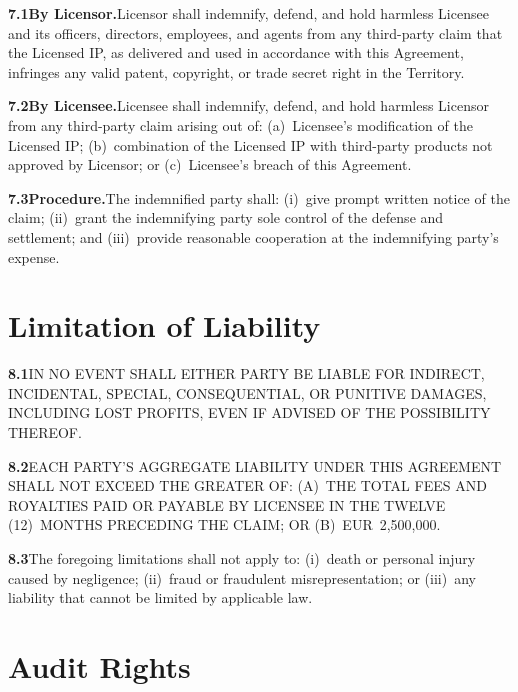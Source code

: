 \documentclass[11pt,a4paper]{article}
\begin{document}
\textbf{7.1\enspace By Licensor.}\enspace Licensor shall indemnify, defend, and hold harmless
Licensee and its officers, directors, employees, and agents from any third-party claim that the
Licensed IP, as delivered and used in accordance with this Agreement, infringes any valid
patent, copyright, or trade secret right in the Territory.

\textbf{7.2\enspace By Licensee.}\enspace Licensee shall indemnify, defend, and hold harmless
Licensor from any third-party claim arising out of: (a)~Licensee's modification of the
Licensed IP; (b)~combination of the Licensed IP with third-party products not approved by
Licensor; or (c)~Licensee's breach of this Agreement.

\textbf{7.3\enspace Procedure.}\enspace The indemnified party shall: (i)~give prompt written
notice of the claim; (ii)~grant the indemnifying party sole control of the defense and
settlement; and (iii)~provide reasonable cooperation at the indemnifying party's expense.

\section{Limitation of Liability}

\begin{tcolorbox}[warnstyle]
\small\color{NexaText}
\textbf{8.1}\enspace IN NO EVENT SHALL EITHER PARTY BE LIABLE FOR INDIRECT, INCIDENTAL,
SPECIAL, CONSEQUENTIAL, OR PUNITIVE DAMAGES, INCLUDING LOST PROFITS, EVEN IF ADVISED OF
THE POSSIBILITY THEREOF.

\textbf{8.2}\enspace EACH PARTY'S AGGREGATE LIABILITY UNDER THIS AGREEMENT SHALL NOT EXCEED
THE GREATER OF: (A)~THE TOTAL FEES AND ROYALTIES PAID OR PAYABLE BY LICENSEE IN THE
TWELVE (12)~MONTHS PRECEDING THE CLAIM; OR (B)~EUR~2{,}500{,}000.

\textbf{8.3}\enspace The foregoing limitations shall not apply to: (i)~death or personal
injury caused by negligence; (ii)~fraud or fraudulent misrepresentation; or (iii)~any liability
that cannot be limited by applicable law.
\end{tcolorbox}

\section{Audit Rights}
\end{document}
